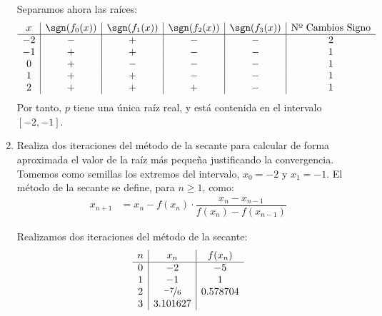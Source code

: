 \begin{ejercicio}
\begin{enumerate}
        Separamos ahora las raíces:
        \begin{equation*}
            \begin{array}{c|c|c|c|c|c}
                x & \sgn(f_0(x)) & \sgn(f_1(x)) & \sgn(f_2(x)) & \sgn(f_3(x)) & \text{Nº Cambios Signo}\\ \hline
                -2 & - & + & - & - & 2\\
                -1 & + & + & - & - & 1\\
                0 & + & - & - & - & 1\\
                1 & + & + & - & - & 1\\
                2 & + & + & + & - & 1
            \end{array}
        \end{equation*}
        Por tanto, $p$ tiene una única raíz real, y está contenida en el intervalo $[-2,-1]$.
        \item Realiza dos iteraciones del método de la secante para calcular de forma aproximada el valor de la raíz más pequeña justificando la convergencia.\\
        
        Tomemos como semillas los extremos del intervalo, $x_0=-2$ y $x_1=-1$. El método de la secante se define, para $n\geq 1$, como:
        \begin{align*}
            x_{n+1} &= x_n - f(x_n)\cdot \dfrac{x_n-x_{n-1}}{f(x_n)-f(x_{n-1})}
        \end{align*}

        Realizamos dos iteraciones del método de la secante:
        \begin{equation*}
            \begin{array}{c|c|c}
                n & x_n & f(x_n)\\ \hline
                0 & -2 & -5\\
                1 & -1 & 1\\
                2 & \nicefrac{-7}{6} & 0.578704\\
                3 & 3.101627
            \end{array}
        \end{equation*}

    \end{enumerate}
\end{ejercicio}

